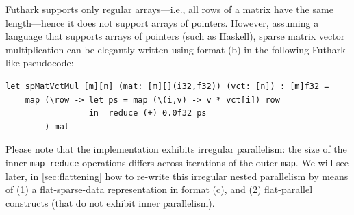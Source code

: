 \documentclass[acmsmall,review]{acmart}\settopmatter{printfolios=true,printccs=false,printacmref=false}
\begin{document}
Futhark supports only regular arrays---i.e., all rows of a matrix have 
the same length---hence it does not support arrays of pointers. 
However, assuming a language that supports arrays of pointers 
(such as Haskell), sparse matrix vector multiplication can be 
elegantly written using format (b) in the following Futhark-like 
pseudocode:
\begin{lstlisting}[mathescape=true]
let spMatVctMul [m][n] (mat: [m][](i32,f32)) (vct: [n]) : [m]f32 =
    map (\row -> let ps = map (\(i,v) -> v * vct[i]) row
                 in  reduce (+) 0.0f32 ps 
        ) mat
\end{lstlisting}\vspace{-2ex}
Please note that the implementation exhibits irregular parallelism:
the size of the inner \lstinline{map-reduce} operations differs 
across iterations of the outer \lstinline{map}. We will see later,
in \cref{sec:flattening} how to re-write this irregular nested
parallelism by means of (1) a flat-sparse-data representation 
in format (c), and (2) flat-parallel constructs (that do not exhibit
inner parallelism).

%
\end{document}
